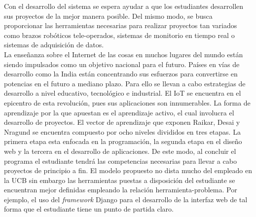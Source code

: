 Con el desarrollo del sistema se espera ayudar a que los estudiantes desarrollen sus proyectos de
la mejor manera posible. Del mismo modo, se busca proporcionar las herramientas necesarias
para realizar proyectos tan variados como brazos robóticos tele-operados, sistemas de monitorio
en tiempo real o sistemas de adquisición de datos\cite{alcaraz2014internet}.\\
La enseñanza sobre el Internet de las cosas en muchos lugares del mundo están siendo impulsados
como un objetivo nacional para el futuro. Países en vías de desarrollo como la India están
concentrando sus esfuerzos para convertirse en potencias en el futuro a mediano plazo. Para
ello se llevan a cabo estrategias de desarrollo a nivel educativo, tecnológico e industrial. El IoT
se encuentra en el epicentro de esta revolución, pues sus aplicaciones son innumerables. La
forma de aprendizaje por la que apuestan es el aprendizaje activo, el cual involucra el desarrollo
de proyectos. El vector de aprendizaje que exponen Raikar, Desai y Nragund se encuentra
compuesto por ocho niveles divididos en tres etapas. La primera etapa esta enfocada en la programación, la segunda etapa en el diseño web y la tercera en el desarrollo de aplicaciones. De
este modo, al concluir el programa el estudiante tendrá las competencias necesarias para llevar
a cabo proyectos de principio a fin\cite{raikar2016active}. El modelo propuesto no dista mucho del empleado en
la UCB sin embargo las herramientas puestas a disposición del estudiante se encuentran mejor
definidas empleando la relación herramienta-problema. Por ejemplo, el uso del \textit{framework}
Django para el desarrollo de la interfaz web de tal forma que el estudiante tiene un punto de
partida claro.



